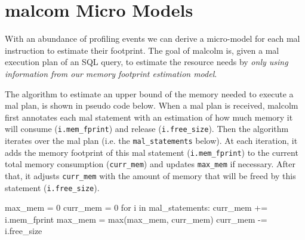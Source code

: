 \documentclass[conference]{IEEEtran}
\begin{document}

\section{{\sc malcom} Micro Models}
\label{sec:malcolm} 
With an abundance of profiling events we can derive a micro-model for each {\sc mal} instruction to estimate their footprint.
The goal of {\sc malcolm} is, given a {\sc mal} execution plan of an SQL query, to estimate the resource needs by \textit{only using information from our memory footprint estimation model}.

The algorithm to estimate an upper bound of the memory needed to execute a {\sc mal} plan, is shown in pseudo code below.
When a {\sc mal} plan is received, {\sc malcolm} first annotates each {\sc mal} statement with an estimation of how much memory it will consume (\texttt{\small i.mem\_fprint}) and release (\texttt{\small i.free\_size}).
Then the algorithm iterates over the {\sc mal} plan (i.e. the \texttt{\small mal\_statements} below).
At each iteration, it adds the memory footprint of this {\sc mal} statement (\texttt{\small i.mem\_fprint}) to the current total memory consumption (\texttt{\small curr\_mem}) and updates \texttt{\small max\_mem} if necessary.
After that, it adjusts \texttt{\small curr\_mem} with the amount of memory that will be freed by this statement (\texttt{\small i.free\_size}). 
\begin{verb}
max_mem  = 0
curr_mem = 0 
for i in mal_statements:
  curr_mem += i.mem_fprint
  max_mem = max(max_mem, curr_mem)
  curr_mem -= i.free_size
\end{verb}
\end{document}
